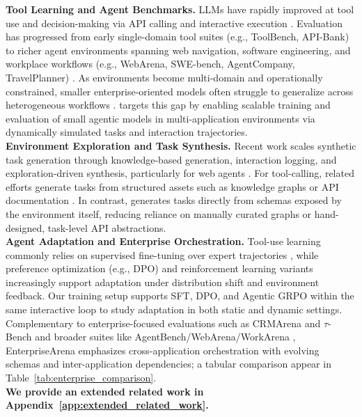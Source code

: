 \documentclass{article}
\theoremstyle{plain}
\theoremstyle{definition}
\theoremstyle{remark}
\begin{document}
\textbf{Tool Learning and Agent Benchmarks.}
LLMs have rapidly improved at tool use and decision-making via API calling and interactive execution \cite{qintoolllm, qian2023toolalpaca, liutoolace, schick2023toolformer, qu2024exploration}. Evaluation has progressed from early single-domain tool suites (e.g., ToolBench, API-Bank) \cite{qintoolllm, li2023api} to richer agent environments spanning web navigation, software engineering, and workplace workflows (e.g., WebArena, SWE-bench, AgentCompany, TravelPlanner) \cite{zhouwebarena, yangswe, xu2024theagentcompany, xie2024travelplanner}. As environments become multi-domain and operationally constrained, smaller enterprise-oriented models often struggle to generalize across heterogeneous workflows \cite{shen2024small, manduzio2024improving}. \name{} targets this gap by enabling scalable training and evaluation of small agentic models in multi-application environments via dynamically simulated tasks and interaction trajectories.
\\
\noindent \textbf{Environment Exploration and Task Synthesis.}
Recent work scales synthetic task generation through knowledge-based generation, interaction logging, and exploration-driven synthesis, particularly for web agents \cite{ou2024synatra, lai2024autowebglm, murty2024bagel, murty2024nnetnav, gandhi2025go, sun2025genesis, ramrakhya2025scaling}. For tool-calling, related efforts generate tasks from structured assets such as knowledge graphs or API documentation \cite{chen2025graph2eval, liutoolace}. In contrast, \name{} generates tasks directly from schemas exposed by the environment itself, reducing reliance on manually curated graphs or hand-designed, task-level API abstractions.
\\
\noindent \textbf{Agent Adaptation and Enterprise Orchestration.}
Tool-use learning commonly relies on supervised fine-tuning over expert trajectories \cite{weifinetuned, qintoolllm}, while preference optimization (e.g., DPO) \cite{rafailov2023direct} and reinforcement learning variants increasingly support adaptation under distribution shift and environment feedback. Our training setup supports SFT, DPO, and Agentic GRPO \cite{singh2025agentic, shao2024deepseekmath} within the same interactive loop to study adaptation in both static and dynamic settings. Complementary to enterprise-focused evaluations such as CRMArena and $\tau$-Bench \cite{huang2025crmarena, huang2025crmarenapro, yao2025tau} and broader suites like AgentBench/WebArena/WorkArena \cite{liu2024agentbench, zhouwebarena, drouin2024workarena}, EnterpriseArena emphasizes cross-application orchestration with evolving schemas and inter-application dependencies; a tabular comparison appear in Table~\ref{tab:enterprise_comparison}.
\\
\noindent \textbf{We provide an extended related work in Appendix~\ref{app:extended_related_work}.}
\end{document}
